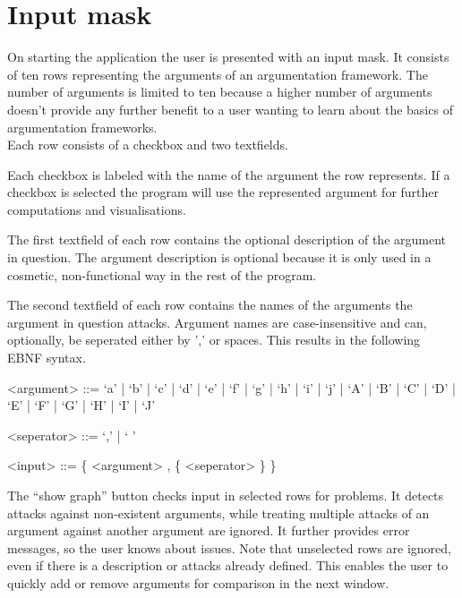 \documentclass[draft,final]{vutinfth} %
\newcommand{\hl}{\par\vspace{6pt}} %
\begin{document}
\section{Input mask}
On starting the application the user is presented with an input mask. It consists of ten rows representing the arguments of an argumentation framework. The number of arguments is limited to ten because a higher number of arguments doesn't provide any further benefit to a user wanting to learn about the basics of argumentation frameworks.\\
Each row consists of a checkbox and two textfields.\hl
Each checkbox is labeled with the name of the argument the row represents. If a checkbox is selected the program will use the represented argument for further computations and visualisations.\hl
The first textfield of each row contains the optional description of the argument in question. The argument description is optional because it is only used in a cosmetic, non-functional way in the rest of the program.\hl
The second textfield of each row contains the names of the arguments the argument in question attacks. Argument names are case-insensitive and can, optionally, be seperated either by ',' or spaces. This results in the following EBNF syntax.\hl %

\begin{grammar}%
	<argument> ::= `a' | `b' | `c' | `d' | `e' | `f'
				| `g' | `h' | `i' | `j' | `A' | `B'
				| `C' | `D' | `E' | `F' | `G' | `H'
				| `I' | `J'

	<seperator> ::= `,' | ` '
	
	<input> ::= \{ <argument> , \{ <seperator> \} \}
\end{grammar}\hl

The ``show graph'' button checks input in selected rows for problems. It detects attacks against non-existent arguments, while treating multiple attacks of an argument against another argument are ignored. It further provides error messages, so the user knows about issues. Note that unselected rows are ignored, even if there is a description or attacks already defined. This enables the user to quickly add or remove arguments for comparison in the next window.\hl
\end{document}
